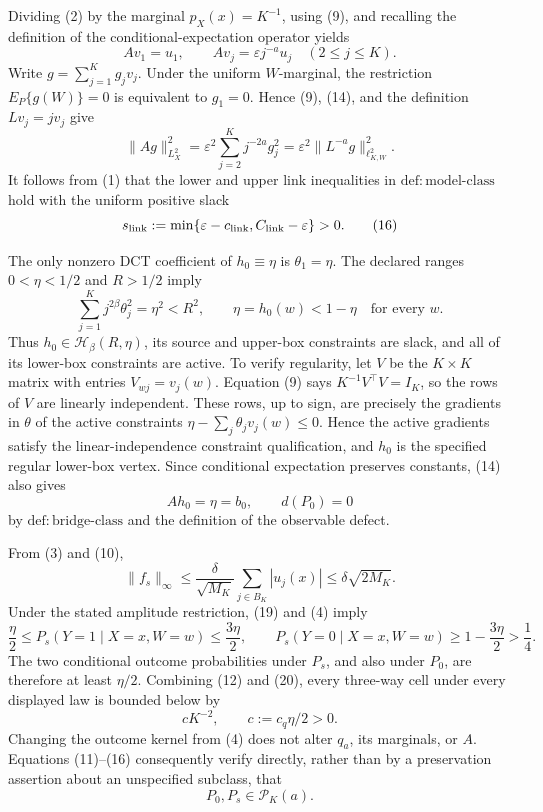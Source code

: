 Dividing (2) by the marginal \(p_X(x)=K^{-1}\), using (9), and recalling the definition of the conditional-expectation operator yields
\[
Av_1=u_1,
\qquad
Av_j=\varepsilon j^{-a}u_j
\quad (2\le j\le K).
\tag{14}
\]
Write \(g=\sum_{j=1}^Kg_jv_j\).  Under the uniform \(W\)-marginal, the restriction \(E_P\{g(W)\}=0\) is equivalent to \(g_1=0\).  Hence (9), (14), and the definition \(Lv_j=jv_j\) give
\[
\|Ag\|_{L^2_X}^2
=\varepsilon^2\sum_{j=2}^Kj^{-2a}g_j^2
=\varepsilon^2\|L^{-a}g\|_{\ell^2_{K,W}}^2.
\tag{15}
\]
It follows from (1) that the lower and upper link inequalities in \(\mathrm{def:model\mbox{-}class}\) hold with the uniform positive slack
\[
s_{\rm link}:=\min\{\varepsilon-c_{\rm link},C_{\rm link}-\varepsilon\}>0.
\tag{16}
\]

The only nonzero DCT coefficient of \(h_0\equiv\eta\) is \(\theta_1=\eta\).  The declared ranges \(0<\eta<1/2\) and \(R>1/2\) imply
\[
\sum_{j=1}^Kj^{2\beta}\theta_j^2=\eta^2<R^2,
\qquad
\eta=h_0(w)<1-\eta
\quad\text{for every }w.
\tag{17}
\]
Thus \(h_0\in\mathcal H_\beta(R,\eta)\), its source and upper-box constraints are slack, and all of its lower-box constraints are active.  To verify regularity, let \(V\) be the \(K\times K\) matrix with entries \(V_{wj}=v_j(w)\).  Equation (9) says \(K^{-1}V^\top V=I_K\), so the rows of \(V\) are linearly independent.  These rows, up to sign, are precisely the gradients in \(\theta\) of the active constraints \(\eta-\sum_j\theta_jv_j(w)\le0\).  Hence the active gradients satisfy the linear-independence constraint qualification, and \(h_0\) is the specified regular lower-box vertex.  Since conditional expectation preserves constants, (14) also gives
\[
Ah_0=\eta=b_0,
\qquad
d(P_0)=0
\tag{18}
\]
by \(\mathrm{def:bridge\mbox{-}class}\) and the definition of the observable defect.

From (3) and (10),
\[
\|f_s\|_\infty
\le \frac{\delta}{\sqrt{M_K}}\sum_{j\in B_K}|u_j(x)|
\le\delta\sqrt{2M_K}.
\tag{19}
\]
Under the stated amplitude restriction, (19) and (4) imply
\[
\frac\eta2\le P_s(Y=1\mid X=x,W=w)\le\frac{3\eta}{2},
\qquad
P_s(Y=0\mid X=x,W=w)\ge1-\frac{3\eta}{2}>\frac14.
\tag{20}
\]
The two conditional outcome probabilities under \(P_s\), and also under \(P_0\), are therefore at least \(\eta/2\).  Combining (12) and (20), every three-way cell under every displayed law is bounded below by
\[
cK^{-2},
\qquad
c:=c_q\eta/2>0.
\tag{21}
\]
Changing the outcome kernel from (4) does not alter \(q_a\), its marginals, or \(A\).  Equations (11)--(16) consequently verify directly, rather than by a preservation assertion about an unspecified subclass, that
\[
P_0,P_s\in\mathcal P_K(a).
\tag{22}
\]

